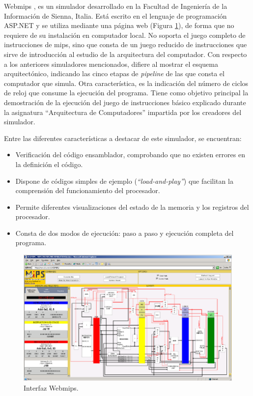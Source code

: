 Web\acrshort{mips} \cite{branovic2004webmips}, es un simulador desarrollado en la Facultad de Ingeniería de la Información de Sienna, Italia. Está escrito en el lenguaje de programación ASP.NET y se utiliza mediante una página web (Figura \ref{fig:webmips_figure}), de forma que no requiere de su instalación en computador local. No soporta el juego completo de instrucciones de \acrshort{mips}, sino que consta de un juego reducido de instrucciones que sirve de introducción al estudio de la arquitectura del computador. Con respecto a los anteriores simuladores mencionados, difiere al mostrar el esquema arquitectónico, indicando las cinco etapas de \emph{pipeline} de las que consta el computador que simula. Otra característica, es la indicación del número de ciclos de reloj que consume la ejecución del programa. Tiene como objetivo principal la demostración de la ejecución del juego de instrucciones básico explicado durante la asignatura ``Arquitectura de Computadores'' impartida por los creadores del simulador.

Entre las diferentes características a destacar de este simulador, se encuentran:

\begin{itemize}
	
\item Verificación del código \gls{ensamblador}, comprobando que no existen errores en la definición el código.

\item Dispone de códigos simples de ejemplo (\textit{``load-and-play''}) que facilitan la comprensión del funcionamiento del procesador.

\item Permite diferentes visualizaciones del estado de la memoria y los registros del procesador.

\item Consta de dos modos de ejecución: paso a paso y ejecución completa del programa.
	
\end{itemize}

\begin{figure}[htbp]
 	\centering
 	\includegraphics[width=15cm]{figures/webmips_figure}
 	\caption{ Interfaz Web\acrshort{mips}.}
	\label{fig:webmips_figure}
\end{figure}


